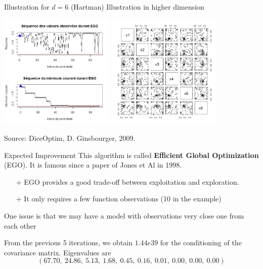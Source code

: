 \documentclass{beamer}
\begin{document}
\begin{frame}{}

\begin{exampleblock}{Illustration for $d=6$ (Hartman)}
	Illustration in higher dimension
\begin{center}
\includegraphics[height=5.5cm]{figures/egoHartman} \includegraphics[height=5.5cm]{figures/egoHartman2}
\end{center}
\small Source: DiceOptim, D. Ginsbourger, 2009.
\end{exampleblock}
\end{frame}

\begin{frame}{Expected Improvement}
This algorithm is called \textbf{Efficient Global Optimization} (EGO). It is famous since a paper of Jones et Al in 1998.\\
\vspace{5mm}
\begin{itemize}
	\item[+] EGO provides a good trade-off between exploitation and exploration.
	\item[+] It only requires a few function observations (10 in the example)
\end{itemize}
One issue is that we may have a model with observations very close one from each other\\
\begin{example}
From the previous 5 iterations, we obtain $1.44e39$ for the conditioning of the covariance matrix. Eigenvalues are
$$ (67.70,\  24.86,\  5.13,\  1.68,\  0.45,\  0.16,\  0.01,\  0.00,\  0.00,\ 0.00) $$
\end{example}
\end{frame}
\end{document}
